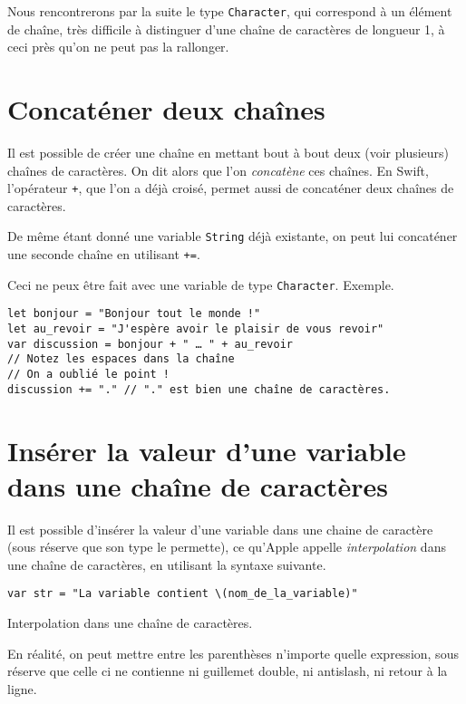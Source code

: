 Nous rencontrerons par la suite le type \texttt{Character}, qui correspond à un élément de chaîne, très difficile à distinguer d'une chaîne de caractères de longueur 1, à ceci près qu'on ne peut pas la rallonger.
\section{Concaténer deux chaînes}
Il est possible de créer une chaîne en mettant bout à bout deux (voir plusieurs) chaînes de caractères. On dit alors que l'on \emph{concatène} ces chaînes. En Swift, l'opérateur \verb"+", que l'on a déjà croisé, permet aussi de concaténer deux chaînes de caractères.

De même étant donné une variable \texttt{String} déjà existante, on peut lui concaténer une seconde chaîne en utilisant \verb"+=".

Ceci ne peux être fait avec une variable de type \texttt{Character}. Exemple.

\begin{listing}[h]
\begin{verbatim}
let bonjour = "Bonjour tout le monde !"
let au_revoir = "J'espère avoir le plaisir de vous revoir"
var discussion = bonjour + " … " + au_revoir
// Notez les espaces dans la chaîne
// On a oublié le point !
discussion += "." // "." est bien une chaîne de caractères.
\end{verbatim}
\end{listing}
\section{Insérer la valeur d'une variable dans une chaîne de caractères}
Il est possible d'insérer la valeur d'une variable dans une chaine de caractère (sous réserve que son type le permette), ce qu'Apple appelle \emph{interpolation} dans une chaîne de caractères, en utilisant la syntaxe suivante.
\begin{listing}[h]
\begin{verbatim}
var str = "La variable contient \(nom_de_la_variable)"
\end{verbatim}
\caption{Interpolation dans une chaîne de caractères.}
\end{listing}%

En réalité, on peut mettre entre les parenthèses n'importe quelle expression, sous réserve que celle ci ne contienne ni guillemet double, ni antislash, ni retour à la ligne.


